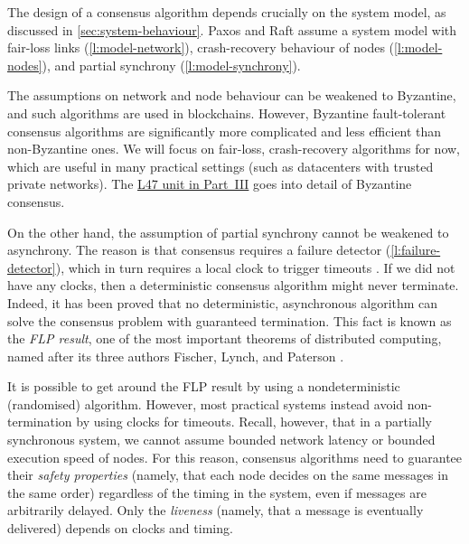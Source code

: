 The design of a consensus algorithm depends crucially on the system model, as discussed in \autoref{sec:system-behaviour}.
Paxos and Raft assume a system model with fair-loss links (\autoref{l:model-network}), crash-recovery behaviour of nodes (\autoref{l:model-nodes}), and partial synchrony (\autoref{l:model-synchrony}).

The assumptions on network and node behaviour can be weakened to Byzantine, and such algorithms are used in blockchains.
However, Byzantine fault-tolerant consensus algorithms are significantly more complicated and less efficient than non-Byzantine ones.
We will focus on fair-loss, crash-recovery algorithms for now, which are useful in many practical settings (such as datacenters with trusted private networks).
The \href{\ledgersystems}{L47 unit in Part~III} goes into detail of Byzantine consensus.

On the other hand, the assumption of partial synchrony cannot be weakened to asynchrony.
The reason is that consensus requires a failure detector (\autoref{l:failure-detector}), which in turn requires a local clock to trigger timeouts \citep{Chandra:1996}.
If we did not have any clocks, then a deterministic consensus algorithm might never terminate.
Indeed, it has been proved that no deterministic, asynchronous algorithm can solve the consensus problem with guaranteed termination.
This fact is known as the \emph{FLP result}, one of the most important theorems of distributed computing, named after its three authors Fischer, Lynch, and Paterson \citep{Fischer:1985}.

It is possible to get around the FLP result by using a nondeterministic (randomised) algorithm.
However, most practical systems instead avoid non-termination by using clocks for timeouts.
Recall, however, that in a partially synchronous system, we cannot assume bounded network latency or bounded execution speed of nodes.
For this reason, consensus algorithms need to guarantee their \emph{safety properties} (namely, that each node decides on the same messages in the same order) regardless of the timing in the system, even if messages are arbitrarily delayed.
Only the \emph{liveness} (namely, that a message is eventually delivered) depends on clocks and timing.


